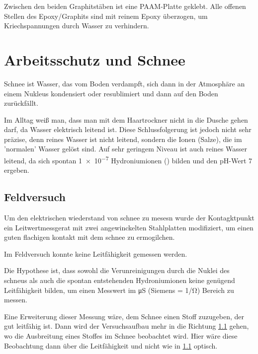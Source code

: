 Zwischen den beiden Graphitstäben ist eine PAAM-Platte geklebt. Alle offenen Stellen des Epoxy/Graphits sind mit reinem Epoxy überzogen, um Kriechspannungen durch Wasser zu verhindern.

\section{Arbeitsschutz und Schnee}

Schnee ist Wasser, das vom Boden verdampft, sich dann in der Atmosphäre an einem Nukleus kondensiert oder resublimiert und dann auf den Boden zurückfällt.

Im Alltag weiß man, dass man mit dem Haartrockner nicht in die Dusche gehen darf, da Wasser elektrisch leitend ist. Diese Schlussfolgerung ist jedoch nicht sehr präzise, denn reines Wasser ist nicht leitend, sondern die Ionen (Salze), die im 'normalen' Wasser gelöst sind. Auf sehr geringem Niveau ist auch reines Wasser leitend, da sich spontan \SI{1e-7}{\molar} Hydroniumionen () bilden und den pH-Wert 7 ergeben.


\subsection{Feldversuch}

\fi

Um den elektrischen wiederstand von schnee zu mesesn wurde der Kontagktpunkt ein Leitwertmessgerat mit zwei angewinckelten Stahlplatten modifiziert, um einen guten flachigen kontakt mit dem schnee zu ermogilchen.


Im Feldversuch konnte keine Leitfähigkeit gemessen werden.


Die Hypothese ist, dass sowohl die Verunreinigungen durch die Nuklei des schneus als auch die spontan entstehenden Hydroniumionen  keine genügend Leitfähigkeit bilden,  um einen Messwert im \si{\micro\siemens} (Siemens = \si{1/\ohm}) Bereich zu messen.

Eine Erweiterung dieser Messung wäre, dem Schnee einen Stoff zuzugeben, der gut leitfähig ist. Dann wird der Versuchsaufbau mehr in die Richtung \ref{} gehen, wo die Ausbreitung eines Stoffes im Schnee beobachtet wird. Hier wäre diese Beobachtung dann über die Leitfähigkeit und nicht wie in \ref{} optisch.

